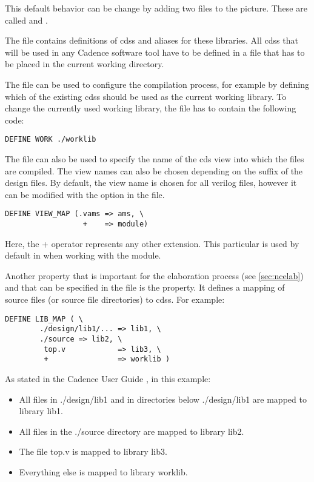 This default behavior can be change by adding two files to the picture. These
are called  and .

The  file contains definitions of \glspl{cds}
and aliases for these libraries. All \glspl{cds} that will be used in any
Cadence software tool have to be defined in a  file that has to be
placed in the current working directory.

The  file can be used to configure the
compilation process, for example by defining which of the existing \glspl{cds}
should be used as the current working library. To change the currently used
working library, the  file has to contain the following code:
\begin{verbatim}
DEFINE WORK ./worklib
\end{verbatim}

The  file can also be used to specify the name of the \gls{cds}
view into which the  files are compiled. The view names can also be
chosen depending on the suffix of the design files. By default, the view name
 is chosen for all verilog files, however it can be modified with
the  option in the  file.
\begin{verbatim}
DEFINE VIEW_MAP (.vams => ams, \
                  +    => module)
\end{verbatim}
Here, the + operator represents any other extension. This particular
\ti{VIEW\_MAP} is used by default in \ti{brICk} when working with the
\ti{cadence\_ius} module.

Another property that is important for the elaboration process (see
\cref{sec:ncelab}) and that can be specified in the \ti{hdl.var} file is the
\ti{LIB\_MAP} property. It defines a mapping of source files (or source file
directories) to \glspl{cds}. For example:
\begin{verbatim}
DEFINE LIB_MAP ( \
        ./design/lib1/... => lib1, \
        ./source => lib2, \
         top.v            => lib3, \
         +                => worklib )
\end{verbatim}

As stated in the Cadence User Guide \citep{cds2014compverilog}, in this example:
\begin{itemize}
    \item All files in ./design/lib1 and in directories below ./design/lib1 are
 mapped to library lib1.
    \item All files in the ./source directory are mapped to library lib2.
    \item The file top.v is mapped to library lib3.
    \item Everything else is mapped to library worklib.
\end{itemize}

